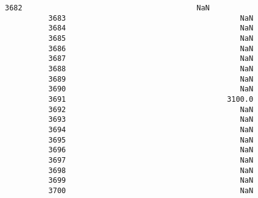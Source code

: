\documentclass[11pt]{article}
\begin{document}
\begin{Verbatim}[commandchars=\\\{\}]
          3682                                        NaN   
          3683                                        NaN   
          3684                                        NaN   
          3685                                        NaN   
          3686                                        NaN   
          3687                                        NaN   
          3688                                        NaN   
          3689                                        NaN   
          3690                                        NaN   
          3691                                     3100.0   
          3692                                        NaN   
          3693                                        NaN   
          3694                                        NaN   
          3695                                        NaN   
          3696                                        NaN   
          3697                                        NaN   
          3698                                        NaN   
          3699                                        NaN   
          3700                                        NaN   
          

\end{Verbatim}
\end{document}
